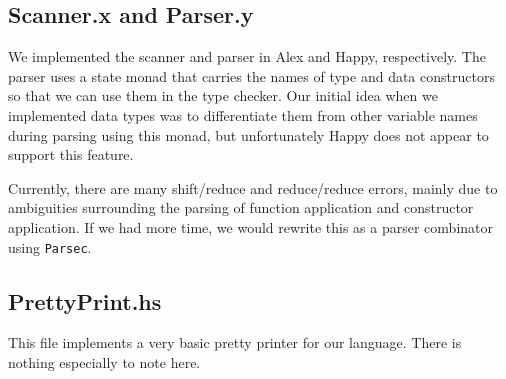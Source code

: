 \subsection{Scanner.x and Parser.y}
We implemented the scanner and parser in Alex and Happy, respectively. The
parser uses a state monad that carries the names of type and data constructors
so that we can use them in the type checker. Our initial idea when we
implemented data types was to differentiate them from other variable names
during parsing using this
monad, but unfortunately Happy does not appear to support this feature.

Currently, there are many shift/reduce and reduce/reduce errors, mainly due to
ambiguities surrounding the parsing of function application and
constructor application. If we had more time, we would rewrite this as a parser
combinator using \texttt{Parsec}.

\subsection{PrettyPrint.hs}
This file implements a very basic pretty printer for our language. There is
nothing especially to note here.
